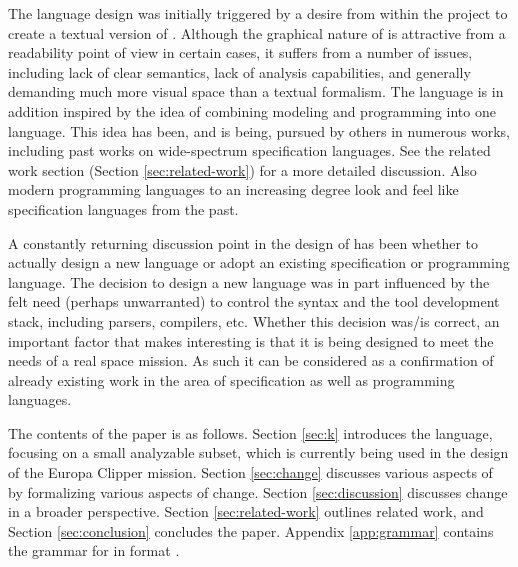 The \Klang{} language design was initially triggered by a desire from within
the \ems{} project to create a textual version of \sysml. Although the graphical
nature of \sysml{} is attractive from a readability point of view in certain cases, it 
suffers from a number of issues, including lack of clear semantics, lack of analysis 
capabilities, and generally demanding
much more visual space than a textual formalism. The \Klang{} language is in addition 
inspired by the idea of combining modeling and programming into one
language. This idea has been, and is being, pursued by others in numerous 
works, including past works on wide-spectrum specification languages. See the
related work section (Section \ref{sec:related-work}) for a more detailed 
discussion. Also modern programming languages to an increasing degree look and 
feel like specification languages from the past. 

A constantly returning discussion point in the design of \Klang{} has been whether to 
actually design a new language or adopt an existing specification or programming 
language. The decision to design a new language was in part influenced by the felt 
need (perhaps unwarranted) to control the syntax and the tool development stack,
including parsers, compilers, etc. Whether this decision was/is correct, an important 
factor that makes \Klang{} interesting is that it is being designed 
to meet the needs of a real space mission. As such it can be considered as
a confirmation of already existing work in the area of specification as well as 
programming languages.

The contents of the paper is as follows. 
Section \ref{sec:k} introduces the \Klang{} language, focusing on a small
analyzable subset, which is currently being used in the design of the Europa
Clipper mission.
Section \ref{sec:change} discusses various aspects of \Klang{} by formalizing
various aspects of change.
Section \ref{sec:discussion} discusses change in a broader perspective.
Section \ref{sec:related-work} outlines related work, and 
Section \ref{sec:conclusion} concludes the paper.
Appendix \ref{app:grammar} contains the grammar for \Klang{} in \antlr{} 
format \cite{antlr}.
